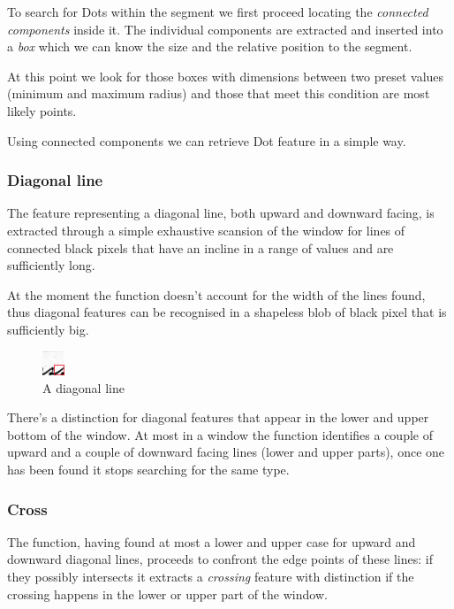 To search for Dots within the segment we first proceed locating the \emph{connected components} inside it. The individual components are extracted and inserted into a \emph{box} which we can know the size and the relative position to the segment.


At this point we look for those boxes with dimensions between two preset values (minimum and maximum radius) and those that meet this condition are most likely points.

Using connected components we can retrieve Dot feature in a simple way.

\subsubsection{Diagonal line}

The feature representing a diagonal line, both upward and downward facing, is extracted through a simple exhaustive scansion of the window for lines of connected black pixels that have an incline in a range of values and are sufficiently long.

At the moment the function doesn't account for the width of the lines found, thus diagonal features can be recognised in a shapeless blob of black pixel that is sufficiently big. 
\begin{figure}
  \vspace{-20pt}
  \begin{center}
    \includegraphics[width=0.06\textwidth]{images/diagonal.jpg}
  \end{center}
  \vspace{-20pt}
  \caption{A diagonal line}
  \vspace{-10pt}
\end{figure}
   
There's a distinction for diagonal features that appear in the lower and upper bottom of the window.
At most in a window the function identifies a couple of upward and a couple of downward facing lines (lower and upper parts), once one has been found it stops searching for the same type.

\subsubsection{Cross}
The function, having found at most a lower and upper case for upward and downward diagonal lines, proceeds to confront the edge points of these lines: if they possibly intersects it extracts a \emph{crossing} feature with distinction if the crossing happens in the lower or upper part of the window. 

